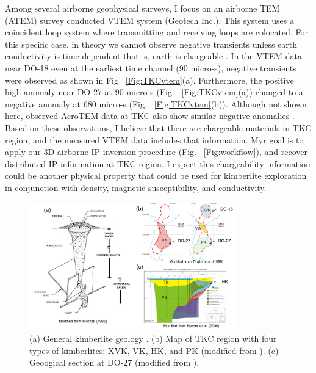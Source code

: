 \documentclass[letterpaper,11pt]{article}
\begin{document}
Among several airborne geophysical surveys, I focus on an airborne TEM (ATEM) survey conducted VTEM system (Geotech Inc.). This system uses a coincident loop system where transmitting and receiving loops are colocated. For this specific case, in theory we cannot observe negative transients unless earth conductivity is time-dependent that is, earth is chargeable \cite[]{Weidelt1982}. In the VTEM data near DO-18 even at the earliest time channel (90 micro-s), negative transients were observed as shown in Fig ~\ref{Fig:TKCvtem}(a). Furthermore, the positive high anomaly near DO-27 at 90 micro-s (Fig. ~\ref{Fig:TKCvtem}(a)) changed to a  negative anomaly at 680 micro-s (Fig. ~\ref{Fig:TKCvtem}(b)). Although not shown here, observed AeroTEM data at TKC also show similar negative anomalies \cite[]{JansenEtAl2004}. Based on these observations, I believe that there are chargeable materials in TKC region, and the measured VTEM data includes that information. Myr goal is to apply our 3D airborne IP inversion procedure (Fig. ~\ref{Fig:workflow}), and recover distributed IP information at TKC region. I expect this chargeability information could be another physical property that could be used for kimberlite exploration in conjunction with density, magnetic susceptibility, and conductivity. 

\begin{figure}[htb]
  \centering
  \includegraphics[width=0.8\textwidth]{figures/tkcgeo.png}
  \caption{(a) General kimberlite geology \cite[]{PowerHildes2007}. (b) Map of TKC region with four types of kimberlites: XVK, VK, HK, and PK (modified from \cite{JansenEtAl2004}). (c) Geoogical section at DO-27 (modified from \cite{HarderEtAl2006}). }
  \label{Fig:tkcgeo}
\end{figure}
\end{document}
